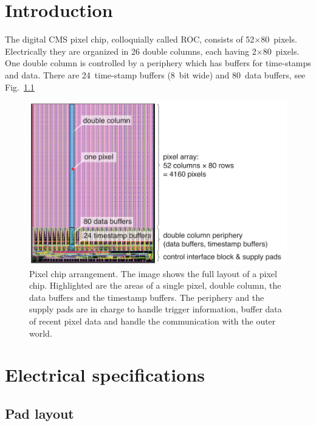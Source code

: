 \chapter{Introduction}

The digital CMS pixel chip, colloquially called \gls{ROC}, consists of 52$\times$80~pixels. Electrically they are organized in 26 double columns, each having 2$\times$80~pixels. One double column is controlled by a periphery which has buffers for time-stamps and data. There are 24~time-stamp buffers (8~bit wide) and 80~data buffers, see Fig.~\ref{fig:ROCimage}

\begin{figure}[hbtp]
	\begin{center}
	\includegraphics[width=.9\textwidth]{img/ROCimage.pdf}
	\end{center}
	\caption{Pixel chip arrangement. The image shows the full layout of a pixel chip. Highlighted are the areas of a single pixel, double column, the data buffers and the timestamp buffers. The periphery and the supply pads are in charge to handle trigger information, buffer data of recent pixel data and handle the communication with the outer world.}
	\label{fig:ROCimage}
\end{figure}

\chapter{Electrical specifications}
\section{Pad layout}

